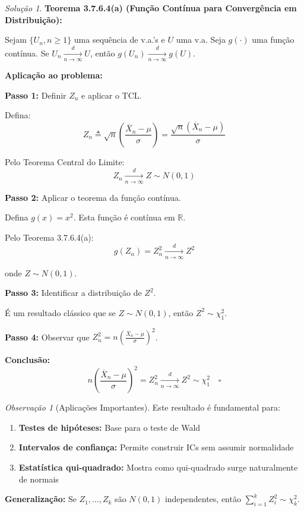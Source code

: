 \documentclass[12pt,a4paper]{article}
\theoremstyle{definition}
\theoremstyle{remark}
\newtheorem{solucao}{Solução}[section]
\newtheorem{observacao}{Observação}[section]
\begin{document}
\begin{solucao}
\textbf{Teorema 3.7.6.4(a) (Função Contínua para Convergência em Distribuição):} 

Sejam $\{U_n, n \geq 1\}$ uma sequência de v.a.'s e $U$ uma v.a. Seja $g(\cdot)$ uma função contínua. Se $U_n \xrightarrow[n \to \infty]{d} U$, então $g(U_n) \xrightarrow[n \to \infty]{d} g(U)$.

\textbf{Aplicação ao problema:}

\textbf{Passo 1:} Definir $Z_n$ e aplicar o TCL.

Defina:
\[
Z_n \triangleq \sqrt{n} \left( \frac{\overline{X}_n - \mu}{\sigma} \right) = \frac{\sqrt{n}(\overline{X}_n - \mu)}{\sigma}
\]

Pelo Teorema Central do Limite:
\[
Z_n \xrightarrow[n \to \infty]{d} Z \sim N(0,1)
\]

\textbf{Passo 2:} Aplicar o teorema da função contínua.

Defina $g(x) = x^2$. Esta função é contínua em $\mathbb{R}$.

Pelo Teorema 3.7.6.4(a):
\[
g(Z_n) = Z_n^2 \xrightarrow[n \to \infty]{d} Z^2
\]

onde $Z \sim N(0,1)$.

\textbf{Passo 3:} Identificar a distribuição de $Z^2$.

É um resultado clássico que se $Z \sim N(0,1)$, então $Z^2 \sim \chi^2_1$.

\textbf{Passo 4:} Observar que $Z_n^2 = n\left(\frac{\overline{X}_n - \mu}{\sigma}\right)^2$.

\textbf{Conclusão:}
\[
n \left( \frac{\overline{X}_n - \mu}{\sigma} \right)^2 = Z_n^2 \xrightarrow[n \to \infty]{d} Z^2 \sim \chi^2_1 \quad \square
\]
\end{solucao}

\begin{observacao}[Aplicações Importantes]
Este resultado é fundamental para:
\begin{enumerate}
    \item \textbf{Testes de hipóteses:} Base para o teste de Wald
    \item \textbf{Intervalos de confiança:} Permite construir ICs sem assumir normalidade
    \item \textbf{Estatística qui-quadrado:} Mostra como qui-quadrado surge naturalmente de normais
\end{enumerate}

\textbf{Generalização:} Se $Z_1, \ldots, Z_k$ são $N(0,1)$ independentes, então $\sum_{i=1}^k Z_i^2 \sim \chi^2_k$.
\end{observacao}
\end{document}
